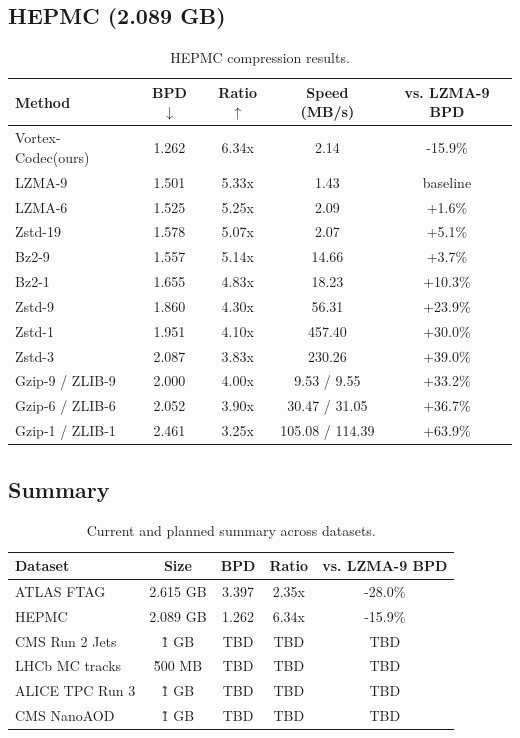 \documentclass[10pt,twocolumn]{article}
\newcommand{\codec}{Vortex-Codec}
\begin{document}
\subsection{HEPMC (2.089 GB)}
\begin{table}[t]
\centering
\small
\caption{HEPMC compression results.}
\label{tab:hepmc_results}
\begin{tabular}{@{}lcccc@{}}
\toprule
Method & BPD $\downarrow$ & Ratio $\uparrow$ & Speed (MB/s) & vs. LZMA-9 BPD \\
\midrule
\codec (ours) & 1.262 & 6.34x & 2.14 & -15.9\% \\
LZMA-9 & 1.501 & 5.33x & 1.43 & baseline \\
LZMA-6 & 1.525 & 5.25x & 2.09 & +1.6\% \\
Zstd-19 & 1.578 & 5.07x & 2.07 & +5.1\% \\
Bz2-9 & 1.557 & 5.14x & 14.66 & +3.7\% \\
Bz2-1 & 1.655 & 4.83x & 18.23 & +10.3\% \\
Zstd-9 & 1.860 & 4.30x & 56.31 & +23.9\% \\
Zstd-1 & 1.951 & 4.10x & 457.40 & +30.0\% \\
Zstd-3 & 2.087 & 3.83x & 230.26 & +39.0\% \\
Gzip-9 / ZLIB-9 & 2.000 & 4.00x & 9.53 / 9.55 & +33.2\% \\
Gzip-6 / ZLIB-6 & 2.052 & 3.90x & 30.47 / 31.05 & +36.7\% \\
Gzip-1 / ZLIB-1 & 2.461 & 3.25x & 105.08 / 114.39 & +63.9\% \\
\bottomrule
\end{tabular}
\end{table}

\subsection{Summary}
\begin{table}[h]
\centering
\small
\caption{Current and planned summary across datasets.}
\label{tab:summary}
\begin{tabular}{@{}lcccc@{}}
\toprule
Dataset & Size & BPD & Ratio & vs. LZMA-9 BPD \\
\midrule
ATLAS FTAG & 2.615 GB & 3.397 & 2.35x & -28.0\% \\
HEPMC & 2.089 GB & 1.262 & 6.34x & -15.9\% \\
CMS Run 2 Jets & \~1 GB & TBD & TBD & TBD \\
LHCb MC tracks & \~500 MB & TBD & TBD & TBD \\
ALICE TPC Run 3 & \~1 GB & TBD & TBD & TBD \\
CMS NanoAOD & \~1 GB & TBD & TBD & TBD \\
\bottomrule
\end{tabular}
\end{table}
\end{document}
